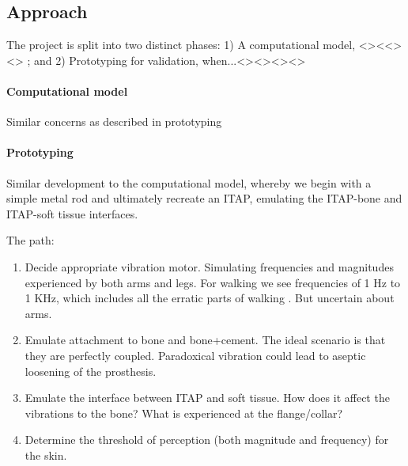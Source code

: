 \subsection{Approach}
The project is split into two distinct phases: 1) A computational model, <><<><> ; and 2) Prototyping for validation, when...<><><><> 
\paragraph{Computational model}
Similar concerns as described in prototyping
\paragraph{Prototyping}
Similar development to the computational model, whereby we begin with a simple metal rod and ultimately recreate an ITAP, emulating the ITAP-bone and ITAP-soft tissue interfaces.

The path:
\begin{enumerate}
	\item Decide appropriate vibration motor. Simulating frequencies and magnitudes experienced by both arms and legs. For walking we see frequencies of 1 Hz to 1 KHz, which includes all the erratic parts of walking \cite{antonsson_frequency_1985}. But uncertain about arms.
    \item Emulate attachment to bone and bone+cement. The ideal scenario is that they are perfectly coupled. Paradoxical vibration could lead to aseptic loosening of the prosthesis.
    \item Emulate the interface between ITAP and soft tissue. How does it affect the vibrations to the bone? What is experienced at the flange/collar?
    \item Determine the threshold of perception (both magnitude and frequency) for the skin.
\end{enumerate}

